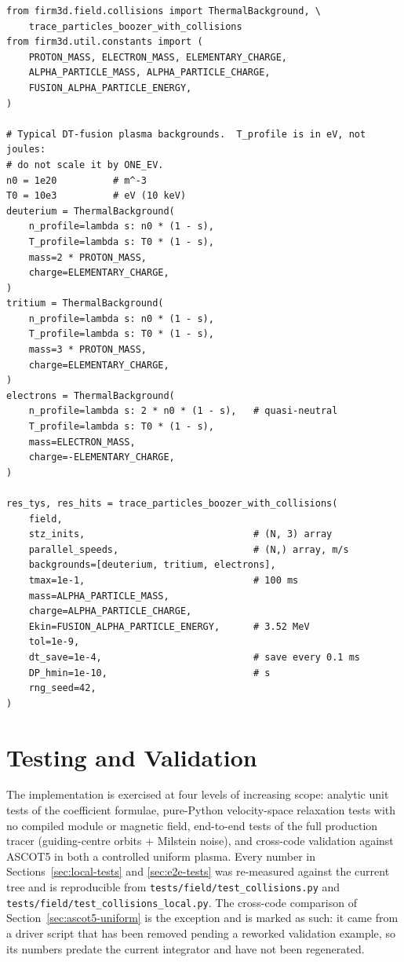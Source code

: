 \documentclass[11pt]{article}
\begin{document}
\begin{verbatim}
from firm3d.field.collisions import ThermalBackground, \
    trace_particles_boozer_with_collisions
from firm3d.util.constants import (
    PROTON_MASS, ELECTRON_MASS, ELEMENTARY_CHARGE,
    ALPHA_PARTICLE_MASS, ALPHA_PARTICLE_CHARGE,
    FUSION_ALPHA_PARTICLE_ENERGY,
)

# Typical DT-fusion plasma backgrounds.  T_profile is in eV, not joules:
# do not scale it by ONE_EV.
n0 = 1e20          # m^-3
T0 = 10e3          # eV (10 keV)
deuterium = ThermalBackground(
    n_profile=lambda s: n0 * (1 - s),
    T_profile=lambda s: T0 * (1 - s),
    mass=2 * PROTON_MASS,
    charge=ELEMENTARY_CHARGE,
)
tritium = ThermalBackground(
    n_profile=lambda s: n0 * (1 - s),
    T_profile=lambda s: T0 * (1 - s),
    mass=3 * PROTON_MASS,
    charge=ELEMENTARY_CHARGE,
)
electrons = ThermalBackground(
    n_profile=lambda s: 2 * n0 * (1 - s),   # quasi-neutral
    T_profile=lambda s: T0 * (1 - s),
    mass=ELECTRON_MASS,
    charge=-ELEMENTARY_CHARGE,
)

res_tys, res_hits = trace_particles_boozer_with_collisions(
    field,
    stz_inits,                              # (N, 3) array
    parallel_speeds,                        # (N,) array, m/s
    backgrounds=[deuterium, tritium, electrons],
    tmax=1e-1,                              # 100 ms
    mass=ALPHA_PARTICLE_MASS,
    charge=ALPHA_PARTICLE_CHARGE,
    Ekin=FUSION_ALPHA_PARTICLE_ENERGY,      # 3.52 MeV
    tol=1e-9,
    dt_save=1e-4,                           # save every 0.1 ms
    DP_hmin=1e-10,                          # s
    rng_seed=42,
)
\end{verbatim}

\section{Testing and Validation}
\label{sec:testing}

The implementation is exercised at four levels of increasing scope: analytic
unit tests of the coefficient formulae, pure-Python velocity-space relaxation
tests with no compiled module or magnetic field, end-to-end tests of the full
production tracer (guiding-centre orbits $+$ Milstein noise), and cross-code
validation against ASCOT5 \cite{ascot5code} in both a controlled uniform
plasma.  Every number in Sections~\ref{sec:local-tests} and
\ref{sec:e2e-tests} was re-measured against the current tree and is
reproducible from \texttt{tests/field/test\_collisions.py} and
\texttt{tests/field/test\_collisions\_local.py}.  The cross-code comparison of
Section~\ref{sec:ascot5-uniform} is the exception and is marked as such: it
came from a driver script that has been removed pending a reworked validation
example, so its numbers predate the current integrator and have not been
regenerated.
\end{document}
